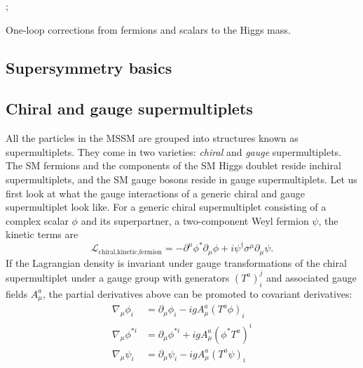 \begin{marginfigure}
;
\caption{One-loop corrections from fermions and scalars to the Higgs mass.}
\end{marginfigure}

\subsection{Supersymmetry basics}
\subsection{Chiral and gauge supermultiplets}
All the particles in the MSSM are grouped into structures known as supermultiplets. They come in two varieties: \emph{chiral} and \emph{gauge} supermultiplets. The SM fermions and the components of the SM Higgs doublet reside inchiral supermultiplets, and the SM gauge bosons reside in gauge supermultiplets. Let us first look at what the gauge interactions of a generic chiral and gauge supermultiplet look like.
For a generic chiral supermultiplet consisting of a complex scalar $\phi$ and its superpartner, a two-component Weyl fermion $\psi$, the kinetic terms are 
\[\mathcal{L}_{\text{chiral,kinetic,fermion}} = -\partial^\mu\phi^*\partial_\mu\phi + i\psi^{\dagger}\overline{\sigma}^\mu\partial_\mu\psi.\]
If the Lagrangian density is invariant under gauge transformations of the chiral supermultiplet under a gauge group with generators $(T^a)_i^j$ and associated gauge fields $A_\mu^a$, the partial derivatives above can be promoted to covariant derivatives:
\begin{align}
  \nabla_\mu\phi_i &= \partial_\mu\phi_i - igA_\mu^a(T^a\phi)_i\label{eq:phi1}\\
  \nabla_\mu\phi^{*i} &= \partial_\mu\phi^{*i} + igA_\mu^a(\phi^*T^a)^{i}\label{eq:phi2}\\
  \nabla_\mu\psi_i &= \partial_\mu\psi_i - igA_\mu^a(T^a\psi)_i\label{eq:psi}
\end{align}

